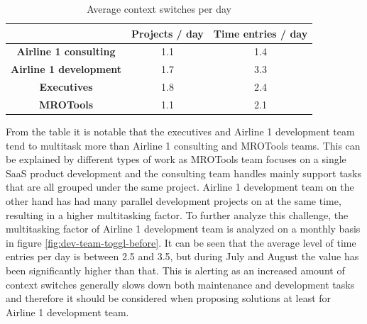 \begin{table}[H]
	\begin{center}
		\begin{tabular}{|c|c|c|}
		\hline
        		              		       & \textbf{Projects / day} & \textbf{Time entries / day} \\ \hline
			\textbf{Airline 1 consulting}  & 1.1                     & 1.4                         \\ \hline
			\textbf{Airline 1 development} & 1.7                     & 3.3                         \\ \hline
			\textbf{Executives}    		    & 1.8                     & 2.4                         \\ \hline
			\textbf{MROTools}         		& 1.1                     & 2.1                         \\ \hline
		
		\end{tabular}
		
		\caption{Average context switches per day}
		\label{table:toggl-before}
	\end{center}
\end{table}

From the table it is notable that the executives and Airline 1 development team tend to multitask more than Airline 1 consulting and MROTools teams. This can be explained by different types of
work as MROTools team focuses on a single SaaS product development and the consulting team handles mainly support tasks that are all grouped under the same project. Airline 1 development team
on the other hand has had many parallel development projects on at the same time, resulting in a higher multitasking factor. To further analyze this challenge, the multitasking factor of Airline 1
development team is analyzed on a monthly basis in figure \ref{fig:dev-team-toggl-before}. It can be seen that the average level
of time entries per day is between 2.5 and 3.5, but during July and August the value has been significantly higher than that. This is alerting as an increased
amount of context switches generally slows down both maintenance and development tasks and therefore it should be considered when proposing solutions
at least for Airline 1 development team.

